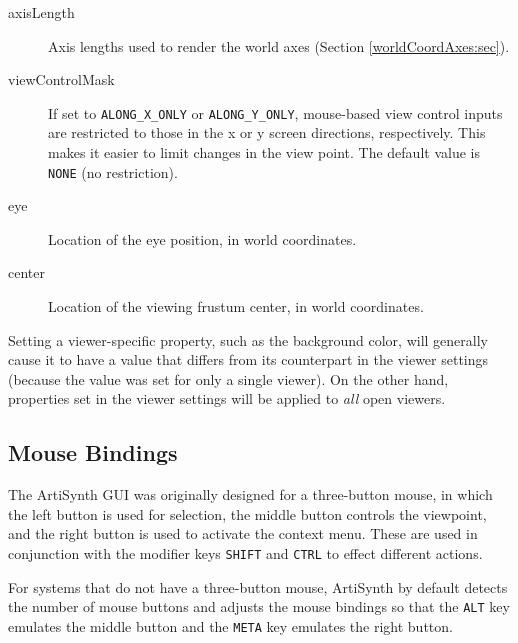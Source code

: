\documentclass{article}
\begin{document}
\begin{description}

\item[axisLength]\mbox{}

Axis lengths used to render the world axes (Section
\ref{worldCoordAxes:sec}).

\item[viewControlMask]\mbox{}

If set to {\tt ALONG\_X\_ONLY} or {\tt ALONG\_Y\_ONLY}, mouse-based
view control inputs are restricted to those in the x or y screen
directions, respectively. This makes it easier to limit changes in the
view point. The default value is {\tt NONE} (no restriction).

\item[eye]\mbox{}

Location of the eye position, in world coordinates.

\item[center]\mbox{}

Location of the viewing frustum center, in world coordinates.

\end{description}

\begin{sideblock}
Setting a viewer-specific property, such as the background color, will
generally cause it to have a value that differs from its counterpart
in the viewer settings (because the value was set for only a single
viewer). On the other hand, properties set in the viewer settings will
be applied to {\it all} open viewers.
\end{sideblock}

\subsection{Mouse Bindings}
\label{MouseBindingsSec}

The ArtiSynth GUI was originally designed for a three-button mouse, in
which the left button is used for selection, the middle button
controls the viewpoint, and the right button is used to activate the
context menu. These are used in conjunction with the modifier keys
{\tt SHIFT} and {\tt CTRL} to effect different actions.

For systems that do not have a three-button mouse, ArtiSynth by
default detects the number of mouse buttons and adjusts the mouse
bindings so that the {\tt ALT} key emulates the middle button and the
{\tt META} key emulates the right button.
\end{document}
